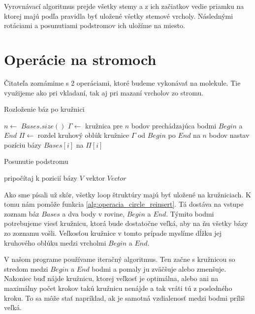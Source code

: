 Vyrovnávací algoritmus prejde všetky stemy a z ich začiatkov vedie priamku na ktorej
majú podľa pravidla byť uložené všetky stemové vrcholy. Následnými rotáciami
a posunutiami podstromov ich uložíme na miesto.




\section{Operácie na stromoch}

Čitateľa zoznámime s 2 operáciami, ktoré budeme vykonávať na molekule. Tie využijeme
ako pri vkladaní, tak aj pri mazaní vrcholov zo stromu.

\begin{algorithm}
  \caption{Rozloženie báz po kružnici}
  \label{alg:operacia_circle_reinsert}
  \begin{algorithmic}[1]
      \State $n \gets$ $Bases.size()$
      \State $\Gamma \gets$ kružnica pre $n$ bodov prechádzajúca bodmi $Begin$ a $End$
      \State $\Pi \gets$ rozdel kruhový oblúk kružnice $\Gamma$ od $Begin$ po $End$ na $n$ bodov
        \State nastav pozíciu bázy $Bases[i]$ na $\Pi[i]$
      \EndFor
    \EndProcedure
  \end{algorithmic}
\end{algorithm}

\begin{algorithm}
  \caption{Posunutie podstromu}
  \label{alg:operacia_tree_shift}
  \begin{algorithmic}[1]
          \State pripočítaj k pozicií bázy $V$ vektor $Vector$
        \EndIf
      \EndFor
    \EndProcedure
  \end{algorithmic}
\end{algorithm}

Ako sme písali už skôr, všetky loop štruktúry majú byť uložené na kružniciach.
K tomu nám pomôže funkcia \ref{alg:operacia_circle_reinsert}.
Tá dostáva na vstupe zoznam báz $Bases$ a dva body v rovine, $Begin$ a $End$.
Týmito bodmi potrebujeme viesť kružnicu, ktorá bude dostatočne veľká, aby
na ňu všetky bázy zo zoznamu vošli. Veľkosťou kružnice v tomto prípade myslíme
dĺžku jej kruhového oblúku medzi vrcholmi $Begin$ a $End$.

V našom programe používame iteračný algoritmus. Ten začne s kružnicou so stredom
medzi $Begin$ a $End$ bodmi a pomaly ju zväčšuje alebo zmenšuje.
Nakoniec buď nájde kružnicu, ktorej veľkosť je optimálna, alebo ani na maximálny
počet krokov takú kružnicu nenájde a tak vráti tú z posledného kroku.
To sa môže stať napríklad, ak je samotná vzdialenosť medzi bodmi príliš veľká.

